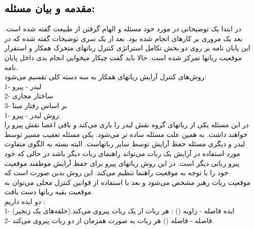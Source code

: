\subsection{مقدمه و بیان مسئله:}
در ابتدا یک توضیحاتی در مورد خود مسئله 
و الهام گرفتن از طبیعت گفته شده است. بعد یک مروری بر کارهای انجام شده بود.
بعد از یک سری توضیحات گفته شده که در این پایان نامه بر روی دو بخش تکامل استراتژی کنترل رباتهای متحرک همکار و استقرار موقعیت رباتها تمرکز شده است. حالا باید گفت چیکار میخوایی انجام بدی داخل پایان نامه.
\\
روش‌های کنترل آرایش رباتهای همکار به سه دسته کلی تقسیم می‌شود:
\\
1- لیدر - پیرو
\\
2- ساختار مجازی
\\
3- بر اساس رفتار مبنا
\\
1- روش لیدر - پیرو:
\\
در این مسئله یکی از رباتهای گروه نقش لیدر را بازی می‌کند و باقی اعضا نقش پیرو را خواهند داشت. به همین علت مسئله ساده تر می‌شود. یکی مسئله تعقیب مسیر توسط لیدر و دیگری مسئله حفظ آرایش توسط سایر رباتهاست.
البته بسته به الگوی متفاوت مورد استفاده در آرایش یک ربات می‌تواند راهنمای ربات دیگر باشد در حالی که خود پیرو رباتی دیگر است.
در این روش رباتهای پیرو برای حفظ آرایش موظفند موقعیت خود را با توجه به موقعیت راهنما تنظیم می‌کند.
این روش بدین صورت است که موقعیت ربات رهبر مشخص می‌شود و بعد با استفاده از قوانین کنترل محلی می‌توان به موقعیت بقیه رباتها دست یافت.
\\
دو ایده داریم :
\\
1- ایده فاصله - زاویه 
()
: هر ربات از یک ربات پیروی می‌کند.(حلقه‌های یک زنجیر)
\\
2- فاصله - فاصله 
()
هر ربات به صورت همزمان از دو ربات پیروی می‌کند.

